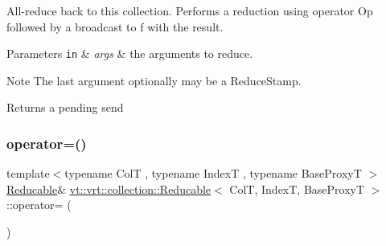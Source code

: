 All-\/reduce back to this collection. Performs a reduction using operator {\ttfamily Op} followed by a broadcast to {\ttfamily f} with the result. 


\begin{DoxyParams}[1]{Parameters}
\mbox{\tt in}  & {\em args} & the arguments to reduce. \\
\hline
\end{DoxyParams}
\begin{DoxyNote}{Note}
The last argument optionally may be a {\ttfamily Reduce\+Stamp}.
\end{DoxyNote}
\begin{DoxyReturn}{Returns}
a pending send 
\end{DoxyReturn}
\mbox{\label{structvt_1_1vrt_1_1collection_1_1_reducable_a7df8661d0e353935f034c4c0174c0872}} 
\subsubsection{\texorpdfstring{operator=()}{operator=()}}
{\footnotesize\ttfamily template$<$typename ColT , typename IndexT , typename Base\+ProxyT $>$ \\
\hyperlink{structvt_1_1vrt_1_1collection_1_1_reducable}{Reducable}\& \hyperlink{structvt_1_1vrt_1_1collection_1_1_reducable}{vt\+::vrt\+::collection\+::\+Reducable}$<$ ColT, IndexT, Base\+ProxyT $>$\+::operator= (\begin{DoxyParamCaption}\item[{\hyperlink{structvt_1_1vrt_1_1collection_1_1_reducable}{Reducable}$<$ ColT, IndexT, Base\+ProxyT $>$ const \&}]{ }\end{DoxyParamCaption})\hspace{0.3cm}{\ttfamily [default]}}

\mbox{\label{structvt_1_1vrt_1_1collection_1_1_reducable_a7c4d42fbe284fa51533ae43e2a5759b1}} 
